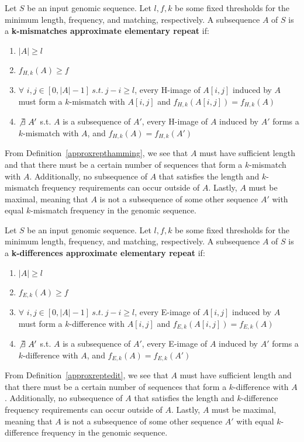 \begin{defn}
Let $S$ be an input genomic sequence. Let $l, f, k$ be some fixed thresholds for the minimum length, frequency, and matching, respectively. A subsequence $A$ of $S$ is a \textbf{k-mismatches approximate elementary repeat} if:
\begin{enumerate}
\item{$|A| \geq l$} 
\item{$f_{H,k}(A) \geq f$}
\item{$\forall$ $i, j \in [0,|A|-1] \ s.t. \ j-i \geq l$, every H-image of $A[i,j]$ induced by $A$ must form a $k$-mismatch with $A[i,j]$ and $f_{H,k}(A[i,j]) = f_{H,k}(A)$}
\item{$\not\exists \ A'$  s.t. $A$ is a subsequence of $A'$, every H-image of $A$ induced by $A'$ forms a $k$-mismatch with $A$, and $f_{H,k}(A) = f_{H,k}(A')$}
\end{enumerate}
\label{approxrepthamming}
\end{defn}

From Definition~\ref{approxrepthamming}, we see that $A$ must have sufficient length and that there must be a certain number of sequences that form a $k$-mismatch with $A$. Additionally, no subsequence of $A$ that satisfies the length and $k$-mismatch frequency requirements can occur outside of $A$. Lastly, $A$ must be maximal, meaning that $A$ is not a subsequence of some other sequence $A'$ with equal $k$-mismatch frequency in the genomic sequence.

\begin{defn}
Let $S$ be an input genomic sequence. Let $l, f, k$ be some fixed thresholds for the minimum length, frequency, and matching, respectively. A subsequence $A$ of $S$ is a \textbf{k-differences approximate elementary repeat} if:
\begin{enumerate}
\item{$|A| \geq l$} %
\item{$f_{E,k}(A) \geq f$}
\item{$\forall$ $i, j \in [0,|A|-1] \ s.t. \ j-i \geq l$, every E-image of $A[i,j]$ induced by $A$ must form a $k$-difference with $A[i,j]$ and $f_{E,k}(A[i,j]) = f_{E,k}(A)$}
\item{$\not\exists \ A'$  s.t. $A$ is a subsequence of $A'$, every E-image of $A$ induced by $A'$ forms a $k$-difference with $A$, and $f_{E,k}(A) = f_{E,k}(A')$}
\end{enumerate}
\label{approxreptedit}
\end{defn}

From Definition~\ref{approxreptedit}, we see that $A$ must have sufficient length and that there must be a certain number of sequences that form a $k$-difference with $A$. Additionally, no subsequence of $A$ that satisfies the length and $k$-difference frequency requirements can occur outside of $A$. Lastly, $A$ must be maximal, meaning that $A$ is not a subsequence of some other sequence $A'$ with equal $k$-difference frequency in the genomic sequence.

